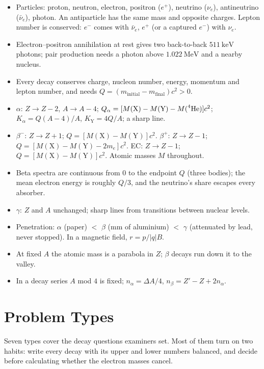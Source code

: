 \begin{itemize}
\item Particles: proton, neutron, electron, positron ($e^+$), neutrino ($\nu_e$), antineutrino
      ($\bar\nu_e$), photon. An antiparticle has the same mass and opposite charges. Lepton number is
      conserved: $e^-$ comes with $\bar\nu_e$, $e^+$ (or a captured $e^-$) with $\nu_e$.
\item Electron--positron annihilation at rest gives two back-to-back $\SI{511}{\keV}$ photons; pair
      production needs a photon above $\SI{1.022}{\MeV}$ and a nearby nucleus.
\item Every decay conserves charge, nucleon number, energy, momentum and lepton number, and needs
      $Q=(m_{\text{initial}}-m_{\text{final}})c^2>0$.
\item $\alpha$: $Z\to Z-2$, $A\to A-4$; $Q_\alpha=[M(\mathrm{X})-M(\mathrm{Y})-M(\prescript{4}{}{\mathrm{He}})]c^2$;
      $K_\alpha=Q(A-4)/A$, $K_{\mathrm{Y}}=4Q/A$; a sharp line.
\item $\beta^-$: $Z\to Z+1$; $Q=[M(\mathrm{X})-M(\mathrm{Y})]c^2$. $\beta^+$: $Z\to Z-1$;
      $Q=[M(\mathrm{X})-M(\mathrm{Y})-2m_e]c^2$. EC: $Z\to Z-1$; $Q=[M(\mathrm{X})-M(\mathrm{Y})]c^2$.
      Atomic masses $M$ throughout.
\item Beta spectra are continuous from $0$ to the endpoint $Q$ (three bodies); the mean electron energy
      is roughly $Q/3$, and the neutrino's share escapes every absorber.
\item $\gamma$: $Z$ and $A$ unchanged; sharp lines from transitions between nuclear levels.
\item Penetration: $\alpha$ (paper) $<$ $\beta$ (mm of aluminium) $<$ $\gamma$ (attenuated by lead, never
      stopped). In a magnetic field, $r=p/|q|B$.
\item At fixed $A$ the atomic mass is a parabola in $Z$; $\beta$ decays run down it to the valley.
\item In a decay series $A$ mod $4$ is fixed; $n_\alpha=\Delta A/4$, $n_\beta=Z'-Z+2n_\alpha$.
\end{itemize}

\section{Problem Types}\label{sec:types-decay}
Seven types cover the decay questions examiners set. Most of them turn on two habits: write every decay
with its upper and lower numbers balanced, and decide before calculating whether the electron masses
cancel.

